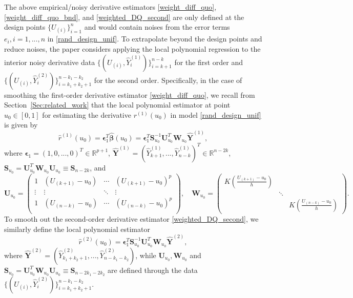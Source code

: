 \documentclass{uwstat572}
\theoremstyle{definition}
\renewcommand{\hat}{\widehat}
\theoremstyle{theorem}
\begin{document}
The above empirical/noisy derivative estimators \eqref{weight_diff_quo}, \eqref{weight_diff_quo_bnd}, and \eqref{weighted_DQ_second} are only defined at the design points $\{U_{(i)}\}_{i=1}^n$ and would contain noises from the error terms $e_i,i=1,...,n$ in \eqref{rand_design_unif}. To extrapolate beyond the design points and reduce noises, the paper considers applying the local polynomial regression to the interior noisy derivative data $\{(U_{(i)}, \hat{Y}_i^{(1)})\}_{i=k+1}^{n-k}$ for the first order and $\{(U_{(i)}, \hat{Y}_i^{(2)})\}_{i=k_1+k_2+1}^{n-k_1-k_2}$ for the second order. Specifically, in the case of smoothing the first-order derivative estimator \eqref{weight_diff_quo}, we recall from Section~\ref{Sec:related_work} that the local polynomial estimator at point $u_0\in [0,1]$ for estimating the derivative $r^{(1)}(u_0)$ in model \eqref{rand_design_unif} is given by
\begin{equation}
\label{loc_poly_first}
\hat{r}^{(1)}(u_0) = \bm{\epsilon}_1^T \hat{\bm{\beta}}(u_0) = \bm{\epsilon}_1^T \bm{S}_{u_0}^{-1} \bm{U}_{u_0}^T \bm{W}_{u_0} \hat{\bm{Y}}^{(1)},
\end{equation}
where $\bm{\epsilon}_1=(1,0,...,0)^T \in \mathbb{R}^{p+1}$, $\hat{\bm{Y}}^{(1)} = \left(\hat{Y}_{k+1}^{(1)},...,\hat{Y}_{n-k}^{(1)}\right)^T \in \mathbb{R}^{n-2k}$, $\bm{S}_{u_0}=\bm{U}_{u_0}^T \bm{W}_{u_0} \bm{U}_{u_0} \equiv \bm{S}_{n-2k}$, and 
$$\bm{U}_{u_0} = \begin{pmatrix}
	1 & \left(U_{(k+1)}-u_0\right) & \cdots & \left(U_{(k+1)}-u_0\right)^p\\
	\vdots & \vdots & \ddots & \vdots\\
	1 & \left(U_{(n-k)}-u_0\right) & \cdots & \left(U_{(n-k)}-u_0\right)^p\\
\end{pmatrix}, \quad \bm{W}_{u_0} = \begin{pmatrix}
	K\left(\frac{U_{(k+1)}-u_0}{h}\right) & & \\
	& \ddots & \\
	& & K\left(\frac{U_{(n-k)}-u_0}{h}\right)
\end{pmatrix}.$$
To smooth out the second-order derivative estimator \eqref{weighted_DQ_second}, we similarly define the local polynomial estimator
\begin{equation}
\label{local_poly_second}
\hat{r}^{(2)}(u_0) = \bm{\epsilon}_1^T \bm{S}_{u_0}^{-1} \bm{U}_{u_0}^T \bm{W}_{u_0} \hat{\bm{Y}}^{(2)},
\end{equation}
where $\hat{\bm{Y}}^{(2)} = \left(\hat{Y}_{k_1+k_2+1}^{(2)},...,\hat{Y}_{n-k_1-k_2}^{(2)}\right)$, while $\bm{U}_{u_0},\bm{W}_{u_0}$ and $\bm{S}_{u_0}=\bm{U}_{u_0}^T \bm{W}_{u_0} \bm{U}_{u_0} \equiv \bm{S}_{n-2k_1-2k_2}$ are defined through the data $\{(U_{(i)}, \hat{Y}_i^{(2)})\}_{i=k_1+k_2+1}^{n-k_1-k_2}$.
\end{document}
